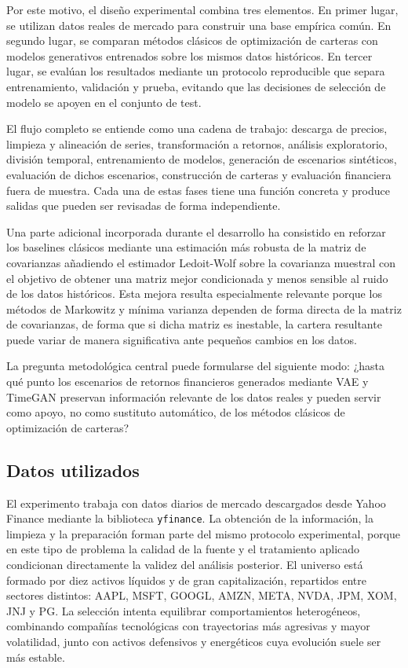 \documentclass[11pt,a4paper,spanish,oneside]{book}
\numberwithin{equation}{chapter}
\numberwithin{figure}{chapter}
\begin{document}
Por este motivo, el diseño experimental combina tres elementos. En primer lugar, se utilizan datos reales de mercado para construir una base empírica común. En segundo lugar, se comparan métodos clásicos de optimización de carteras con modelos generativos entrenados sobre los mismos datos históricos. En tercer lugar, se evalúan los resultados mediante un protocolo reproducible que separa entrenamiento, validación y prueba, evitando que las decisiones de selección de modelo se apoyen en el conjunto de test.

El flujo completo se entiende como una cadena de trabajo: descarga de precios, limpieza y alineación de series, transformación a retornos, análisis exploratorio, división temporal, entrenamiento de modelos, generación de escenarios sintéticos, evaluación de dichos escenarios, construcción de carteras y evaluación financiera fuera de muestra. Cada una de estas fases tiene una función concreta y produce salidas que pueden ser revisadas de forma independiente.

Una parte adicional incorporada durante el desarrollo ha consistido en reforzar los baselines clásicos mediante una estimación más robusta de la matriz de covarianzas añadiendo el estimador Ledoit-Wolf sobre la covarianza muestral con el objetivo de obtener una matriz mejor condicionada y menos sensible al ruido de los datos históricos. Esta mejora resulta especialmente relevante porque los métodos de Markowitz y mínima varianza dependen de forma directa de la matriz de covarianzas, de forma que si dicha matriz es inestable, la cartera resultante puede variar de manera significativa ante pequeños cambios en los datos.

La pregunta metodológica central puede formularse del siguiente modo: ¿hasta qué punto los escenarios de retornos financieros generados mediante VAE y TimeGAN preservan información relevante de los datos reales y pueden servir como apoyo, no como sustituto automático, de los métodos clásicos de optimización de carteras?

\subsection{Datos utilizados}

El experimento trabaja con datos diarios de mercado descargados desde Yahoo Finance mediante la biblioteca \texttt{yfinance}. La obtención de la información, la limpieza y la preparación forman parte del mismo protocolo experimental, porque en este tipo de problema la calidad de la fuente y el tratamiento aplicado condicionan directamente la validez del análisis posterior. El universo está formado por diez activos líquidos y de gran capitalización, repartidos entre sectores distintos: AAPL, MSFT, GOOGL, AMZN, META, NVDA, JPM, XOM, JNJ y PG. La selección intenta equilibrar comportamientos heterogéneos, combinando compañías tecnológicas con trayectorias más agresivas y mayor volatilidad, junto con activos defensivos y energéticos cuya evolución suele ser más estable.
\end{document}
